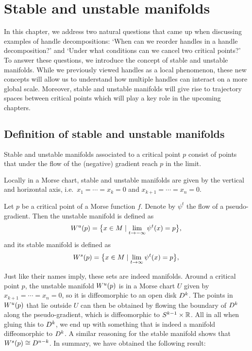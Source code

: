 \chapter{Stable and unstable manifolds}
\label{chap:stable-and-unstable-manifolds}



In this chapter, we address two natural questions that came up when discussing examples of handle decompositions: `When can we reorder handles in a handle decomposition?' and `Under what conditions can we cancel two critical points?'
To answer these questions, we introduce the concept of stable and unstable manifolds.
While we previously viewed handles as a local phenomenon, these new concepts will allow us to understand how multiple handles can interact on a more global scale.
Moreover, stable and unstable manifolds will give rise to trajectory spaces between critical points which will play a key role in the upcoming chapters.

\section{Definition of stable and unstable manifolds}
Stable and unstable manifolds associated to a critical point $p$ consist of points that under the flow of the (negative) gradient reach $p$ in the limit.
\begin{marginfigure}
    \centering
    \caption{Locally in a Morse chart, stable and unstable manifolds are given by the vertical and horizontal axis, i.e.\ $ x_1= \cdots= x_k = 0$ and $x_{k+1}= \cdots= x_n = 0$.}
    \label{fig:stable-and-unstable-manifolds-are-manifiolds}
\end{marginfigure}
\begin{definition}
    Let $p$ be a critical point of a Morse function $f$.
    Denote by $\psi^{t}$ the flow of a pseudo-gradient.
    Then the unstable manifold is defined as
    \[
        W^u(p) = \big\{x \in M  \mid  \lim_{t \to -\infty} \psi^{t} (x)  = p\big\} 
    ,\] 
    and its stable manifold is defined as
    \[
        W^s(p) = \big\{x \in M  \mid  \lim_{t \to \infty} \psi^{t} (x)  = p\big\} 
    ,\] 
\end{definition}
Just like their names imply, these sets are indeed manifolds.
Around a critical point $p$, the unstable manifold $W^u(p)$ is in a Morse chart $U$ given by $x_{k+1} = \cdots = x_n = 0$, so it is diffeomorphic to an open disk $D^{k}$.
The points in $W^u(p)$ that lie outside $U$ can then be obtained by flowing the boundary of $D^{k}$ along the pseudo-gradient, which is diffeomorphic to $S^{k-1} \times \mathbb{R}$. All in all when gluing this to $D^{k}$, we end up with something that is indeed a manifold diffeomorphic to $D^{k}$.
A similar reasoning for the stable manifold shows that $W^s(p) \cong D^{n - k}$.
In summary, we have obtained the following result:

